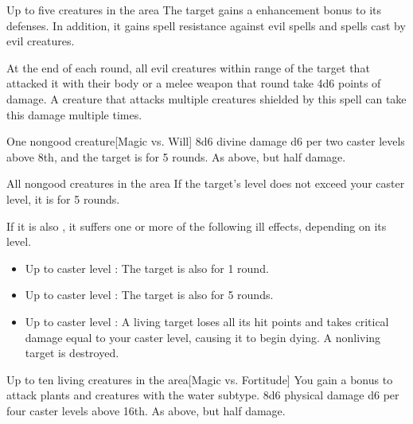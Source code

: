 \spelldur{\durshort \dismissable}
\begin{spelltargets}{Up to five creatures in the area}
    The target gains a  enhancement bonus to its defenses. In addition, it gains spell resistance against evil spells and spells cast by evil creatures.
    \par At the end of each round, all evil creatures within \rngclose range of the target that attacked it with their body or a melee weapon that round take 4d6 points of damage. A creature that attacks multiple creatures shielded by this spell can take this damage multiple times.
\end{spelltargets}

\spellrng{\rngmed}
\begin{spelltarget}{One nongood creature}[Magic vs. Will]
    \spellsuccess 8d6 divine damage \add d6 per two caster levels above 8th, and the target is \bewildered for 5 rounds.
    \spellfailure As above, but half damage.
\end{spelltarget}

\begin{spelltargets}{All nongood creatures in the area}
    \spelleffect If the target's level does not exceed your caster level, it is \deafened for 5 rounds.

    If it is also \bloodied, it suffers one or more of the following ill effects, depending on its level.
    \begin{itemize}
        \item Up to caster level : The target is also \blinded for 1 round.
        \item Up to caster level : The target is also \paralyzed for 5 rounds.
        \item Up to caster level : A living target loses all its hit points and takes critical damage equal to your caster level, causing it to begin dying. A nonliving target is destroyed.
    \end{itemize}
\end{spelltargets}

\begin{spelltargets}{Up to ten living creatures in the area}[Magic vs. Fortitude]
    \spellspecial You gain a  bonus to attack plants and creatures with the water subtype.
    \spellsuccess 8d6 physical damage \add d6 per four caster levels above 16th.
    \spellfailure As above, but half damage.
\end{spelltargets}


